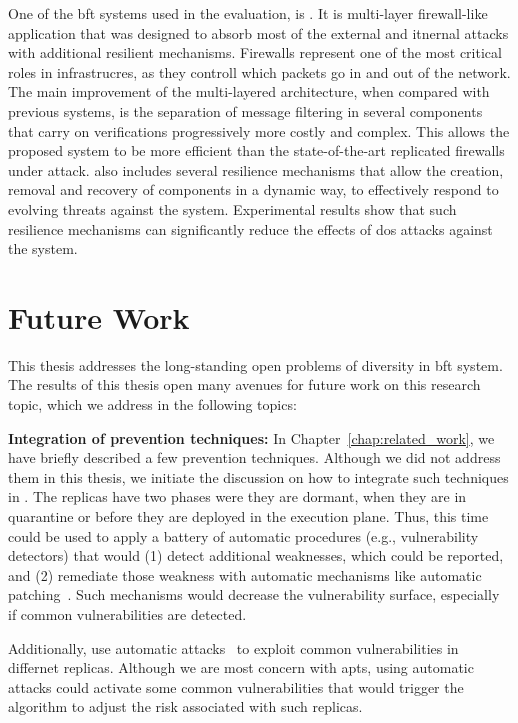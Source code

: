 One of the \gls{bft} systems used in the \system evaluation, is \sieveq. 
It is multi-layer firewall-like application that was designed to absorb most of the external and itnernal attacks with additional resilient mechanisms.
Firewalls represent one of the most critical roles in infrastrucres, as they controll which packets go in and out of the network.
The main improvement of the multi-layered architecture, when compared with previous systems, is the separation of message filtering in several components that carry on verifications progressively more costly and complex.
This allows the proposed system to be more efficient than the state-of-the-art replicated firewalls under attack.
\sieveq also includes several resilience mechanisms that allow the creation, removal and recovery of components in a dynamic way, to effectively respond to evolving threats against the system. Experimental results show that such resilience mechanisms can significantly reduce the effects of \gls{dos} attacks against the system.


\section{Future Work}
This thesis addresses the long-standing open problems of diversity in \gls{bft} system.
The results of this thesis open many avenues for future work on this research topic, which we address in the following topics:


\textbf{Integration of prevention techniques:}
In Chapter~\ref{chap:related_work}, we have briefly described a few prevention techniques.
Although we did not address them in this thesis, we initiate the discussion on how to integrate such techniques in \system.
The \system replicas have two phases were they are dormant, when they are in quarantine or before they are deployed in the execution plane.
Thus, this time could be used to apply a battery of automatic procedures (e.g., vulnerability detectors) that would (1) detect additional weaknesses, which could be reported, and (2) remediate those weakness with automatic mechanisms like automatic patching~\cite{Huang:2016}.
Such mechanisms would decrease the vulnerability surface, especially if common vulnerabilities are detected.

Additionally, use automatic attacks~\cite{Hu:2015} to exploit common vulnerabilities in differnet replicas. 
Although we are most concern with \gls{apts}, using automatic attacks could activate some common vulnerabilities that would trigger the algorithm to adjust the risk associated with such replicas.


